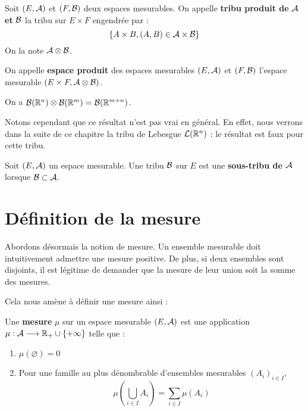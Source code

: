 \documentclass[../integ-proba.tex]{subfiles}
\begin{document}
  \begin{defi}
    Soit $\left(E, \mathcal{A}\right)$ et $\left(F, \mathcal{B}\right)$ deux espaces mesurables.
    On appelle \textbf{tribu produit de} $\mathcal{A}$ \textbf{et} $\mathcal{B}$ la tribu sur $E \times F$ engendrée par :
    \begin{displaymath}
      \left\{A \times B, \left(A, B\right) \in \mathcal{A} \times \mathcal{B}\right\}
    \end{displaymath}
    On la note $\mathcal{A} \otimes \mathcal{B}$.

    On appelle \textbf{espace produit} des espaces mesurables $\left(E, \mathcal{A}\right)$ et $\left(F, \mathcal{B}\right)$ l'espace mesurable $\left(E \times F, \mathcal{A} \otimes \mathcal{B}\right)$.
  \end{defi}

  \begin{exemple}
    On a $\mathcal{B}(\mathbb{R}^n) \otimes \mathcal{B}(\mathbb{R}^m) = \mathcal{B}(\mathbb{R}^{m+n})$.

    Notons cependant que ce résultat n'est pas vrai en général.
    En effet, nous verrons dans la suite de ce chapitre la tribu de Lebesgue $\mathcal{L}(\mathbb{R}^n)$ : le résultat est faux pour cette tribu.
  \end{exemple}

  \begin{defi}
    Soit $\left(E, \mathcal{A}\right)$ un espace mesurable.
    Une tribu $\mathcal{B}$ sur $E$ est une \textbf{sous-tribu de $\mathcal{A}$} lorsque $\mathcal{B} \subset \mathcal{A}$.
  \end{defi}

  \section{Définition de la mesure}

  Abordons désormais la notion de mesure.
  Un ensemble mesurable doit intuitivement admettre une mesure positive.
  De plus, si deux ensembles sont disjoints, il est légitime de demander que la mesure de leur union soit la somme des mesures.

  Cela nous amène à définir une mesure ainsi :

  \begin{defi}
    Une \textbf{mesure} $\mu$ sur un espace mesurable $(E, \mathcal{A})$ est une application $\mu : \mathcal{A} \longrightarrow \mathbb{R}_+ \cup \{ +\infty \}$ telle que :
    \begin{enumerate}
      \item $\mu(\varnothing) = 0$
      \item Pour une famille au plus dénombrable d'ensembles mesurables $\left(A_i\right)_{i \in I}$,
      \begin{displaymath}
        \mu\left(\bigcup_{i \in I}A_i\right) = \sum_{i \in I} \mu\left(A_i\right)
      \end{displaymath}
    \end{enumerate}
  \end{defi}
\end{document}
